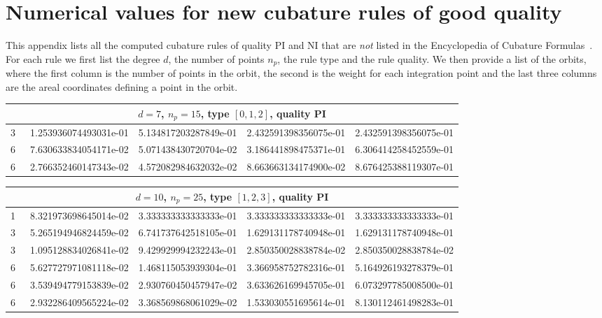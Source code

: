 \documentclass{article}
\begin{document}
\section{Numerical values for new cubature rules of good quality}
\label{sec:app_numer}

This appendix lists all the computed cubature rules of quality PI and NI that are \emph{not} listed in the Encyclopedia of Cubature Formulas~\citep{Cools2003}. For each rule we first list the degree $d$, the number of points $n_p$, the rule type and the rule quality. We then provide a list of the orbits, where the first column is the number of points in the orbit, the second is the weight for each integration point and the last three columns are the areal coordinates defining a point in the orbit.

\begin{center}
\small
\ttfamily
\begin{tabular}{rrrrr}
\multicolumn{5}{c}{\rmfamily $d=7$, $n_p=15$, type $[0,1,2]$, quality PI}\\
\toprule
3 & ~1.253936074493031e-01 & 5.134817203287849e-01 & 2.432591398356075e-01 & 2.432591398356075e-01\\
6 & ~7.630633834054171e-02 & 5.071438430720704e-02 & 3.186441898475371e-01 & 6.306414258452559e-01\\
6 & ~2.766352460147343e-02 & 4.572082984632032e-02 & 8.663663134174900e-02 & 8.676425388119307e-01\\
\bottomrule
\end{tabular}
\bigskip

\begin{tabular}{rrrrr}
\multicolumn{5}{c}{\rmfamily $d=10$, $n_p=25$, type $[1,2,3]$, quality PI}\\
\toprule
1 & ~8.321973698645014e-02 & 3.333333333333333e-01 & 3.333333333333333e-01 & 3.333333333333333e-01\\
3 & ~5.265194946824459e-02 & 6.741737642518105e-01 & 1.629131178740948e-01 & 1.629131178740948e-01\\
3 & ~1.095128834026841e-02 & 9.429929994232243e-01 & 2.850350028838784e-02 & 2.850350028838784e-02\\
6 & ~5.627727971081118e-02 & 1.468115053939304e-01 & 3.366958752782316e-01 & 5.164926193278379e-01\\
6 & ~3.539494779153839e-02 & 2.930760450457947e-02 & 3.633626169945705e-01 & 6.073297785008500e-01\\
6 & ~2.932286409565224e-02 & 3.368569868061029e-02 & 1.533030551695614e-01 & 8.130112461498283e-01\\
\bottomrule
\end{tabular}
\bigskip


\end{center}
\end{document}
